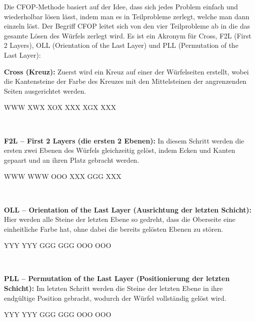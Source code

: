 Die CFOP-Methode basiert auf der Idee, dass sich jedes Problem einfach und wiederholbar lösen lässt, indem man es in Teilprobleme zerlegt, welche man dann einzeln löst.
Der Begriff CFOP leitet sich von den vier Teilprobleme ab in die das gesamte Lösen des Würfels zerlegt wird.
Es ist ein Akronym für Cross, F2L (First 2 Layers), OLL (Orientation of the Last Layer) und PLL (Permutation of the Last Layer):\\[1em]
\parbox{0.7\linewidth}{
\textbf{Cross (Kreuz):} Zuerst wird ein Kreuz auf einer der Würfelseiten erstellt, wobei die Kantensteine der Farbe des Kreuzes mit den Mittelsteinen der angrenzenden Seiten ausgerichtet werden.
}\parbox{0.3\linewidth}{
\centering
\RubikCubeGreyAll%
            {W}{W}{W}
            {X}{W}{X}%
	       {X}{O}{X}
	       {X}{X}{X}%
	       {X}{G}{X}
	       {X}{X}{X}%
}\\[1em]
\parbox{0.7\linewidth}{
\textbf{F2L -- First 2 Layers (die ersten 2 Ebenen):}
In diesem Schritt werden die ersten zwei Ebenen des Würfels gleichzeitig gelöst, indem Ecken und Kanten gepaart und an ihren Platz gebracht werden.
}\parbox{0.3\linewidth}{
\centering
\RubikCubeGreyAll%
            {W}{W}{W}
            {W}{W}{W}%
	       {O}{O}{O}
	       {X}{X}{X}%
	       {G}{G}{G}
	       {X}{X}{X}%
}\\[1em]
\parbox{0.7\linewidth}{
  \textbf{OLL -- Orientation of the Last Layer (Ausrichtung der letzten Schicht):}
  Hier werden alle Steine der letzten Ebene so gedreht, dass die Oberseite eine einheitliche Farbe hat, ohne dabei die bereits gelösten Ebenen zu stören.
}\parbox{0.3\linewidth}{
\centering
\RubikCubeGreyAll%
            {Y}{Y}{Y}
            {Y}{Y}{Y}%
	       {G}{G}{G}
	       {G}{G}{G}%
	       {O}{O}{O}
	       {O}{O}{O}%
}\\[1em]
\parbox{0.7\linewidth}{
  \textbf{PLL -- Permutation of the Last Layer (Positionierung der letzten Schicht):} 
  Im letzten Schritt werden die Steine der letzten Ebene in ihre endgültige Position gebracht, wodurch der Würfel vollständig gelöst wird.
}\parbox{0.3\linewidth}{
\centering
\RubikCubeGreyAll%
            {Y}{Y}{Y}
            {Y}{Y}{Y}%
	       {G}{G}{G}
	       {G}{G}{G}%
	       {O}{O}{O}
	       {O}{O}{O}%
}\\[1em]

